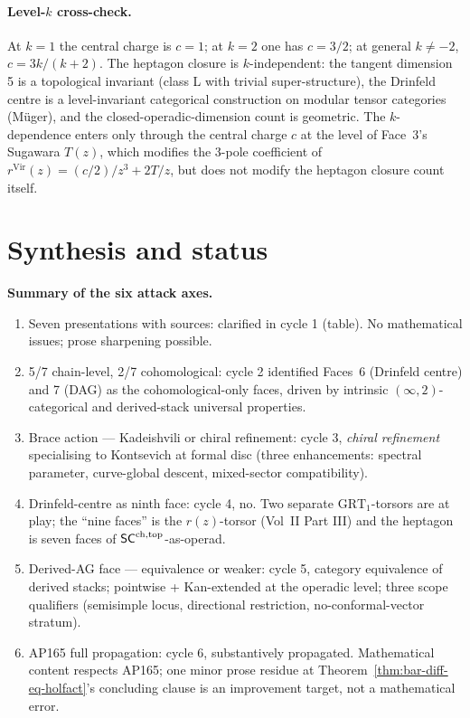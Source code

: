 \paragraph{Level-$k$ cross-check.} At $k = 1$ the central charge is $c = 1$; at $k = 2$ one has $c = 3/2$; at general $k \ne -2$, $c = 3k/(k + 2)$. The heptagon closure is $k$-independent: the tangent dimension 5 is a topological invariant (class L with trivial super-structure), the Drinfeld centre is a level-invariant categorical construction on modular tensor categories (Müger), and the closed-operadic-dimension count is geometric. The $k$-dependence enters only through the central charge $c$ at the level of Face~3's Sugawara $T(z)$, which modifies the 3-pole coefficient of $r^{\mathrm{Vir}}(z) = (c/2)/z^3 + 2T/z$, but does not modify the heptagon closure count itself.

\section{Synthesis and status}

\textbf{Summary of the six attack axes.}
\begin{enumerate}[label=(\alph*)]
\item Seven presentations with sources: clarified in cycle 1 (table). No mathematical issues; prose sharpening possible.
\item 5/7 chain-level, 2/7 cohomological: cycle 2 identified Faces~6 (Drinfeld centre) and 7 (DAG) as the cohomological-only faces, driven by intrinsic $(\infty, 2)$-categorical and derived-stack universal properties.
\item Brace action --- Kadeishvili or chiral refinement: cycle 3, \emph{chiral refinement} specialising to Kontsevich at formal disc (three enhancements: spectral parameter, curve-global descent, mixed-sector compatibility).
\item Drinfeld-centre as ninth face: cycle 4, no. Two separate $\mathrm{GRT}_1$-torsors are at play; the ``nine faces'' is the $r(z)$-torsor (Vol~II Part III) and the heptagon is seven faces of $\mathsf{SC}^{\mathrm{ch},\mathrm{top}}$-as-operad.
\item Derived-AG face --- equivalence or weaker: cycle 5, category equivalence of derived stacks; pointwise + Kan-extended at the operadic level; three scope qualifiers (semisimple locus, directional restriction, no-conformal-vector stratum).
\item AP165 full propagation: cycle 6, substantively propagated. Mathematical content respects AP165; one minor prose residue at Theorem~\ref*{thm:bar-diff-eq-holfact}'s concluding clause is an improvement target, not a mathematical error.
\end{enumerate}

